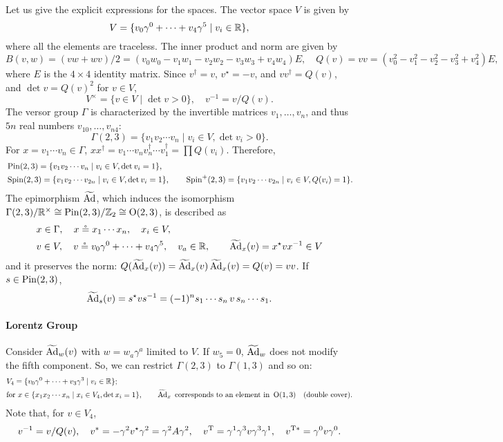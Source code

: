 \documentclass[CheatSheet]{subfiles}
\begin{document}
Let us give the explicit expressions for the spaces. The vector space $V$ is given by
\begin{equation}
V=\{v_0\gamma^0+\cdots+v_4\gamma^5\mid v_i\in{\mathbb{R}}\},
\end{equation}
where all the elements are traceless.
The inner product and norm are given by
\begin{equation}
B(v,w)=(vw+wv)/2=(v_0w_0-v_1w_1-v_2w_2-v_3w_3+v_4w_4)E,\quad
Q(v)=vv=(v_0^2-v_1^2-v_2^2-v_3^2+v_4^2)E,
\end{equation}
where $E$ is the $4\times 4$ identity matrix. Since $v^\dagger=v$, $v^\star=-v$, and $vv^\dagger =Q(v)$, and $\det v=Q(v)^2$ for $v\in V$,
\begin{equation}
V^\times=\{v\in V \mid  \det v>0\},\quad
v^{-1}=v/Q(v).
\end{equation}
The versor group $\Gamma$ is characterized by the invertible matrices $v_1,\dots, v_n$, and thus $5n$ real numbers $v_{10},\dots, v_{n4}$:
\begin{equation}
  \Gamma(2,3)=\{v_1v_2\cdots v_n\mid v_i\in V, \det v_i>0\}.
\end{equation}
For $x=v_1\cdots v_n\in \Gamma$, $xx^\dagger = v_1\cdots v_n v_n^\dagger\cdots v_1^\dagger=\prod Q(v_i)$. Therefore,
\begin{equation}\begin{split}
  &\operatorname{\mathrm{Pin}}(2,3)=\{v_1v_2\cdots v_n\mid v_i\in V, \det v_i=1\},\\
  &\operatorname{\mathrm{Spin}}(2,3)=\{v_1v_2\cdots v_{2n}\mid v_i\in V, \det v_i=1\},\qquad
  \operatorname{\mathrm{Spin}}^+(2,3)=\{v_1v_2\cdots v_{2n}\mid v_i\in V, Q(v_i)=1\}.
\end{split}\end{equation}
The epimorphism $\operatorname{\widetilde{\mathrm{Ad}}}$, which induces the isomorphism $\Gamma(2,3)/{\mathbb{R}}^\times\cong\operatorname{\mathrm{Pin}}(2,3)/{\mathbb{Z}}_2\cong \operatorname{\mathrm O}(2,3)$, is described as
\begin{align*}
&x\in\Gamma,\quad x\circeq x_1\cdots x_n,\quad x_i\in V, \\
&v\in V, \quad v \circeq v_0\gamma^0+\cdots+v_4\gamma^5,\quad v_a\in{\mathbb{R}},\qquad
\operatorname{\widetilde{\mathrm{Ad}}}_x(v)=x^\star v x^{-1}\in V
\end{align*}
and it preserves the norm: $Q(\operatorname{\widetilde{\mathrm{Ad}}}_x(v))=\operatorname{\widetilde{\mathrm{Ad}}}_x(v)\operatorname{\widetilde{\mathrm{Ad}}}_x(v)=Q(v)=vv$.
If $s\in\operatorname{\mathrm{Pin}}(2,3)$,
\[
\operatorname{\widetilde{\mathrm{Ad}}}_s(v)=s^\star v s^{-1}=(-1)^ns_1\cdots s_n\,v\,s_n\cdots s_1.
\]

\paragraph{Lorentz Group} Consider $\operatorname{\widetilde{\mathrm{Ad}}}_w(v)$ with $w=w_a\gamma^a$ limited to $V$. If $w_5=0$, $\operatorname{\widetilde{\mathrm{Ad}}}_w$ does not modify the fifth component. So, we can restrict $\Gamma(2,3)$ to $\Gamma(1,3)$ and so on:
\begin{align}
  &V_4=\{v_0\gamma^0+\cdots+v_3\gamma^3\mid v_i\in{\mathbb{R}}\};\\
  &\text{for~} x\in \{x_1x_2\cdots x_n\mid x_i\in V_4,\det x_i=1\},\qquad \operatorname{\widetilde{\mathrm{Ad}}}_x\text{~corresponds to an element in~}\operatorname{\mathrm O}(1,3) \quad\text{(double cover)}.
\end{align}
Note that, for $v\in V_4$,
\[
  v^{-1}=v/Q(v),\quad
  v^*=-\gamma^2 v^\star \gamma^2=\gamma^2 A\gamma^2,\quad
  v^{\mathrm{T}}=\gamma^1\gamma^3 v\gamma^3\gamma^1,\quad
  v^{{\mathrm{T}}*}=\gamma^0 v\gamma^0.
\]
\end{document}
